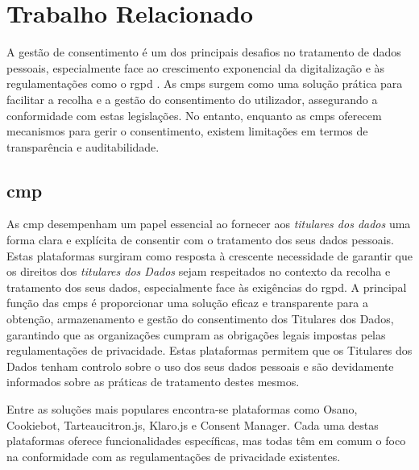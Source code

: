 \label{cap:relacionado}
\chapter{Trabalho Relacionado}

A gestão de consentimento é um dos principais desafios no tratamento de dados pessoais, especialmente face ao crescimento exponencial da digitalização e às regulamentações como o \acrshort{rgpd} \citep{gdpr}.
As \acrshort{cmp}s surgem como uma solução prática para facilitar a recolha e a gestão do consentimento do utilizador, assegurando a conformidade com estas legislações. No entanto, enquanto as \acrshort{cmp}s oferecem mecanismos para gerir o consentimento, existem limitações em termos de transparência e auditabilidade.

\section{\texorpdfstring{\acrfull{cmp}}{CMP}}

As \acrfull{cmp} desempenham um papel essencial ao fornecer aos \textit{titulares dos dados} uma forma clara e explícita de consentir com o tratamento dos seus dados pessoais. Estas plataformas surgiram como resposta à crescente necessidade de garantir que os direitos dos \textit{titulares dos Dados} sejam respeitados no contexto da recolha e tratamento dos seus dados, especialmente face às exigências do \acrshort{rgpd}. A principal função das \acrshort{cmp}s é proporcionar uma solução eficaz e transparente para a obtenção, armazenamento e gestão do consentimento dos Titulares dos Dados, garantindo que as organizações cumpram as obrigações legais impostas pelas regulamentações de privacidade. Estas plataformas permitem que os Titulares dos Dados tenham controlo sobre o uso dos seus dados pessoais e são devidamente informados sobre as práticas de tratamento destes mesmos.

Entre as soluções mais populares encontra-se plataformas como Osano, Cookiebot, Tarteaucitron.js, Klaro.js e Consent Manager. Cada uma destas plataformas oferece funcionalidades específicas, mas todas têm em comum o foco na conformidade com as regulamentações de privacidade existentes.

